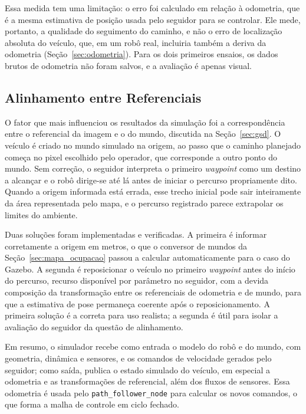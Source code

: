 \documentclass[
    12pt,
    openright,
    oneside,
    a4paper,
    english,
    brazil
]{abntex2}
\begin{document}
Essa medida tem uma limitação: o erro foi calculado em relação à odometria, que é a mesma estimativa de posição usada pelo seguidor para se controlar. Ele mede, portanto, a qualidade do seguimento do caminho, e não o erro de localização absoluta do veículo, que, em um robô real, incluiria também a deriva da odometria (Seção~\ref{sec:odometria}). Para os dois primeiros ensaios, os dados brutos de odometria não foram salvos, e a avaliação é apenas visual.

\subsection{Alinhamento entre Referenciais}
\label{subsec:alinhamento}

O fator que mais influenciou os resultados da simulação foi a correspondência entre o referencial da imagem e o do mundo, discutida na Seção~\ref{sec:gsd}. O veículo é criado no mundo simulado na origem, ao passo que o caminho planejado começa no pixel escolhido pelo operador, que corresponde a outro ponto do mundo. Sem correção, o seguidor interpreta o primeiro \textit{waypoint} como um destino a alcançar e o robô dirige-se até lá antes de iniciar o percurso propriamente dito. Quando a origem informada está errada, esse trecho inicial pode sair inteiramente da área representada pelo mapa, e o percurso registrado parece extrapolar os limites do ambiente.

Duas soluções foram implementadas e verificadas. A primeira é informar corretamente a origem em metros, o que o conversor de mundos da Seção~\ref{sec:mapa_ocupacao} passou a calcular automaticamente para o caso do Gazebo. A segunda é reposicionar o veículo no primeiro \textit{waypoint} antes do início do percurso, recurso disponível por parâmetro no seguidor, com a devida composição da transformação entre os referenciais de odometria e de mundo, para que a estimativa de pose permaneça coerente após o reposicionamento. A primeira solução é a correta para uso realista; a segunda é útil para isolar a avaliação do seguidor da questão de alinhamento.

Em resumo, o simulador recebe como entrada o modelo do robô e do mundo, com geometria, dinâmica e sensores, e os comandos de velocidade gerados pelo seguidor; como saída, publica o estado simulado do veículo, em especial a odometria e as transformações de referencial, além dos fluxos de sensores. Essa odometria é usada pelo \texttt{path\_\allowbreak{}follower\_\allowbreak{}node} para calcular os novos comandos, o que forma a malha de controle em ciclo fechado.
\end{document}

